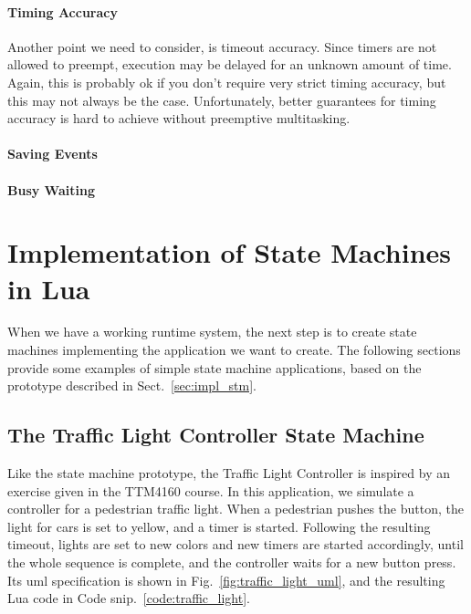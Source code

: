 \paragraph{Timing Accuracy} Another point we need to consider, is timeout accuracy. Since timers are not allowed to preempt, execution may be delayed for an unknown amount of time. Again, this is probably ok if you don't require very strict timing accuracy, but this may not always be the case. Unfortunately, better guarantees for timing accuracy is hard to achieve without preemptive multitasking.

\paragraph{Saving Events}

\paragraph{Busy Waiting}

\section{Implementation of State Machines in Lua}
\label{sec:impl_state_machines}
When we have a working runtime system, the next step is to create state machines implementing the application we want to create. The following sections provide some examples of simple state machine applications, based on the prototype described in Sect.~\ref{sec:impl_stm}.

\subsection{The Traffic Light Controller State Machine}
\label{sec:impl_traffic_light}
Like the state machine prototype, the Traffic Light Controller is inspired by an exercise given in the TTM4160 course. In this application, we simulate a controller for a pedestrian traffic light. When a pedestrian pushes the button, the light for cars is set to yellow, and a timer is started. Following the resulting timeout, lights are set to new colors and new timers are started accordingly, until the whole sequence is complete, and the controller waits for a new button press. Its \gls{uml} specification is shown in Fig.~\ref{fig:traffic_light_uml}, and the resulting Lua code in Code snip.~\ref{code:traffic_light}.

